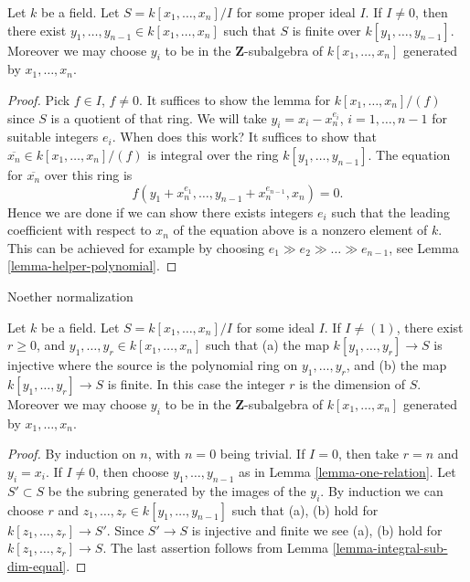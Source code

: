 \begin{lemma}
\label{lemma-one-relation}
Let $k$ be a field.
Let $S = k[x_1, \ldots, x_n]/I$ for some proper ideal $I$.
If $I \not = 0$, then there exist $y_1, \ldots, y_{n-1} \in k[x_1, \ldots, x_n]$
such that $S$ is finite over $k[y_1, \ldots, y_{n-1}]$. Moreover we may
choose $y_i$ to be in the $\mathbf{Z}$-subalgebra of $k[x_1, \ldots, x_n]$
generated by $x_1, \ldots, x_n$.
\end{lemma}

\begin{proof}
Pick $f \in I$, $f\not = 0$. It suffices to show the lemma
for $k[x_1, \ldots, x_n]/(f)$ since $S$ is a quotient of that ring.
We will take $y_i = x_i - x_n^{e_i}$, $i = 1, \ldots, n-1$
for suitable integers $e_i$. When does this work? It suffices
to show that $\overline{x_n} \in k[x_1, \ldots, x_n]/(f)$
is integral over the ring $k[y_1, \ldots, y_{n-1}]$. The
equation for $\overline{x_n}$ over this ring is
$$
f(y_1 + x_n^{e_1}, \ldots, y_{n-1} + x_n^{e_{n-1}}, x_n) = 0.
$$
Hence we are done if we can show there exists integers $e_i$ such
that the leading coefficient with respect to $x_n$ of the equation
above is a nonzero element of $k$. This can be achieved for example
by choosing $e_1 \gg e_2 \gg \ldots \gg e_{n-1}$, see
Lemma \ref{lemma-helper-polynomial}.
\end{proof}

\begin{lemma}
\label{lemma-Noether-normalization}
\begin{slogan}
Noether normalization
\end{slogan}
Let $k$ be a field. Let $S = k[x_1, \ldots, x_n]/I$ for some ideal $I$.
If $I \neq (1)$, there exist $r\geq 0$, and
$y_1, \ldots, y_r \in k[x_1, \ldots, x_n]$
such that (a) the map $k[y_1, \ldots, y_r] \to S$ is injective
where the source is the polynomial ring on $y_1, \ldots, y_r$,
and (b) the map $k[y_1, \ldots, y_r] \to S$ is finite.
In this case the integer $r$ is the dimension of $S$.
Moreover we may choose $y_i$ to be in the
$\mathbf{Z}$-subalgebra of $k[x_1, \ldots, x_n]$
generated by $x_1, \ldots, x_n$.
\end{lemma}

\begin{proof}
By induction on $n$, with $n = 0$ being trivial.
If $I = 0$, then take $r = n$ and $y_i = x_i$.
If $I \not = 0$, then choose $y_1, \ldots, y_{n-1}$
as in Lemma \ref{lemma-one-relation}. Let
$S' \subset S$ be the subring generated by
the images of the $y_i$. By induction we can
choose $r$ and $z_1, \ldots, z_r \in k[y_1, \ldots, y_{n-1}]$
such that (a), (b) hold for $k[z_1, \ldots, z_r]
\to S'$. Since $S' \to S$ is injective and finite
we see (a), (b) hold for $k[z_1, \ldots, z_r]
\to S$. The last assertion follows from Lemma
\ref{lemma-integral-sub-dim-equal}.
\end{proof}

